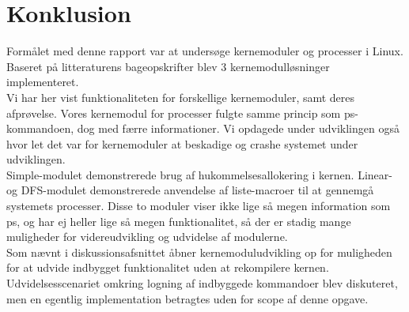 \chapter{Konklusion}
Formålet med denne rapport var at undersøge kernemoduler og processer i Linux. Baseret på litteraturens bageopskrifter blev 3 kernemodulløsninger implementeret.
\\

Vi har her vist funktionaliteten for forskellige kernemoduler, samt deres afprøvelse. Vores kernemodul for processer fulgte samme princip som ps-kommandoen, dog med færre informationer. Vi opdagede under udviklingen også hvor let det var for kernemoduler at beskadige og crashe systemet under udviklingen.
\\

Simple-modulet demonstrerede brug af hukommelsesallokering i kernen. Linear- og DFS-modulet demonstrerede anvendelse af liste-macroer til at gennemgå systemets processer. Disse to moduler viser ikke lige så megen information som ps, og har ej heller lige så megen funktionalitet, så der er stadig mange muligheder for videreudvikling og udvidelse af modulerne.
\\

Som nævnt i diskussionsafsnittet åbner kernemoduludvikling op for muligheden for at udvide indbygget funktionalitet uden at rekompilere kernen. Udvidelsesscenariet omkring logning af indbyggede kommandoer blev diskuteret, men en egentlig implementation betragtes uden for scope af denne opgave.